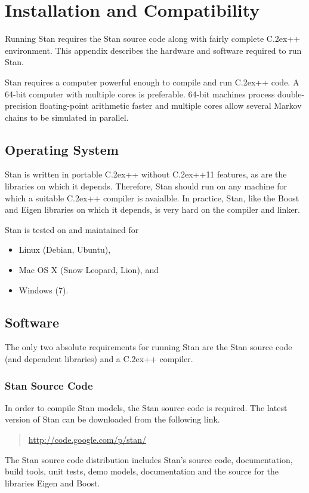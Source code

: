 \documentclass[10pt]{report}
\newcommand{\Stan}{Stan\xspace}
\newcommand*{\Cpp}{C\raise.2ex\hbox{\footnotesize ++}\xspace} %
\begin{document}
\chapter{Installation and Compatibility}\label{install.appendix}

Running \Stan requires the \Stan source code along with fairly
complete \Cpp environment.  This appendix describes the hardware and
software required to run \Stan.  

\Stan requires a computer powerful enough to compile and run \Cpp
code.  A 64-bit computer with multiple cores is preferable.  64-bit
machines process double-precision floating-point arithmetic faster and
multiple cores allow several Markov chains to be simulated in parallel.

\section{Operating System}

\Stan is written in portable \Cpp without {\Cpp}11 features, as are the
libraries on which it depends.  Therefore, \Stan should run on any machine
for which a suitable \Cpp compiler is avaialble.  In practice, \Stan,
like the Boost and Eigen libraries on which it depends, is very hard
on the compiler and linker.

\Stan is tested on and maintained for
%
\begin{itemize}
\item Linux (Debian, Ubuntu), 
\item Mac OS X (Snow Leopard, Lion), and
\item Windows (7).
\end{itemize}
%

\section{Software}

The only two absolute requirements for running \Stan are the
\Stan source code (and dependent libraries) and a \Cpp compiler.

\subsection{\Stan Source Code}

In order to compile \Stan models, the \Stan source code is required.
The latest version of \Stan can be downloaded from the following link.
%
\begin{quote}
\url{http://code.google.com/p/stan/}
\end{quote}
%
The \Stan source code distribution includes \Stan's source code,
documentation, build tools, unit tests, demo models, documentation and
the source for the libraries Eigen and Boost.
\end{document}
